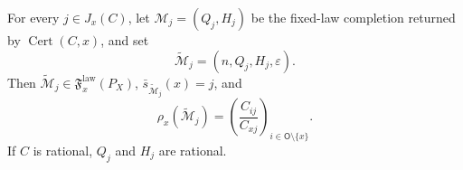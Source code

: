 For every \(j\in J_x(C)\), let \(\mathcal M_j=(Q_j,H_j)\) be the fixed-law completion returned by \(\operatorname{Cert}(C,x)\), and set
\[
 \widetilde{\mathcal M}_j=(n,Q_j,H_j,\varepsilon).
\]
Then \(\widetilde{\mathcal M}_j\in\mathfrak F_x^{\mathrm{law}}(P_X)\), \(\bar s_{\widetilde{\mathcal M}_j}(x)=j\), and
\[
 \rho_x(\widetilde{\mathcal M}_j)
 =\left(\frac{C_{ij}}{C_{xj}}\right)_{i\in\mathsf O\setminus\{x\}}.
\]
If \(C\) is rational, \(Q_j\) and \(H_j\) are rational.